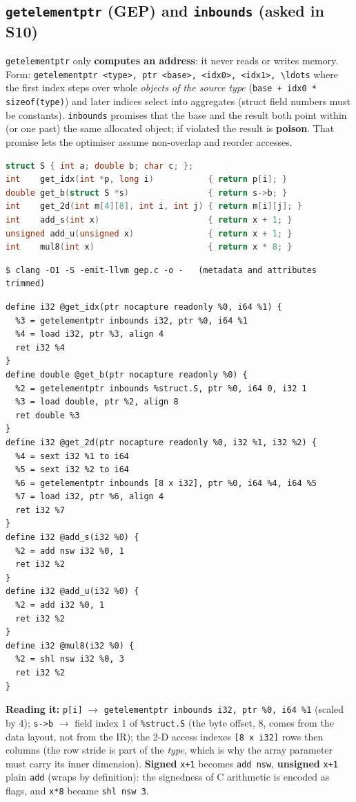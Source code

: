\documentclass[10pt,a4paper,openany,oneside]{report}
\begin{document}
\subsection{\texttt{getelementptr} (GEP) and \texttt{inbounds} (asked in S10)}
\begin{mustbox}
\texttt{getelementptr} only \textbf{computes an address}: it never reads or writes memory. Form: \texttt{getelementptr <type>, ptr <base>, <idx0>, <idx1>, \textbackslash{}ldots} where the first index steps over whole \emph{objects of the source type} (\texttt{base + idx0 * sizeof(type)}) and later indices select into aggregates (struct field numbers must be constants). \texttt{inbounds} promises that the base and the result both point within (or one past) the same allocated object; if violated the result is \textbf{poison}. That promise lets the optimiser assume non-overlap and reorder accesses.
\end{mustbox}
\begin{lstlisting}[language={C}]
struct S { int a; double b; char c; };
int    get_idx(int *p, long i)           { return p[i]; }
double get_b(struct S *s)                { return s->b; }
int    get_2d(int m[4][8], int i, int j) { return m[i][j]; }
int    add_s(int x)                      { return x + 1; }
unsigned add_u(unsigned x)               { return x + 1; }
int    mul8(int x)                       { return x * 8; }
\end{lstlisting}
\begin{lstlisting}[style=shcmd]
$ clang -O1 -S -emit-llvm gep.c -o -   (metadata and attributes trimmed)
\end{lstlisting}
\begin{lstlisting}[language={LLVMIR},style=out]
%struct.S = type { i32, double, i8 }
define i32 @get_idx(ptr nocapture readonly %0, i64 %1) {
  %3 = getelementptr inbounds i32, ptr %0, i64 %1
  %4 = load i32, ptr %3, align 4
  ret i32 %4
}
define double @get_b(ptr nocapture readonly %0) {
  %2 = getelementptr inbounds %struct.S, ptr %0, i64 0, i32 1
  %3 = load double, ptr %2, align 8
  ret double %3
}
define i32 @get_2d(ptr nocapture readonly %0, i32 %1, i32 %2) {
  %4 = sext i32 %1 to i64
  %5 = sext i32 %2 to i64
  %6 = getelementptr inbounds [8 x i32], ptr %0, i64 %4, i64 %5
  %7 = load i32, ptr %6, align 4
  ret i32 %7
}
define i32 @add_s(i32 %0) {
  %2 = add nsw i32 %0, 1
  ret i32 %2
}
define i32 @add_u(i32 %0) {
  %2 = add i32 %0, 1
  ret i32 %2
}
define i32 @mul8(i32 %0) {
  %2 = shl nsw i32 %0, 3
  ret i32 %2
}
\end{lstlisting}
\textbf{Reading it:} \texttt{p[i]} $\to$ \texttt{getelementptr inbounds i32, ptr \%0, i64 \%1} (scaled by 4); \texttt{s->b} $\to$ field index 1 of \texttt{\%struct.S} (the byte offset, 8, comes from the data layout, not from the IR); the 2-D access indexes \texttt{[8 x i32]} rows then columns (the row stride is part of the \emph{type}, which is why the array parameter must carry its inner dimension). \textbf{Signed} \texttt{x+1} becomes \texttt{add nsw}, \textbf{unsigned} \texttt{x+1} plain \texttt{add} (wraps by definition): the signedness of C arithmetic is encoded as flags, and \texttt{x*8} became \texttt{shl nsw 3}.
\end{document}
